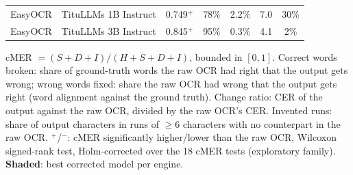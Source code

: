 \begin{table}[t]
\begin{tabular}{llccccc}
EasyOCR & TituLLMs 1B Instruct & 0.749$^{+}$ & 78\% & 2.2\% & 7.0 & 30\% \\
EasyOCR & TituLLMs 3B Instruct & 0.845$^{+}$ & 95\% & 0.3\% & 4.1 & 2\% \\
\bottomrule
\end{tabular}
\par\smallskip
\begin{minipage}{\linewidth}\footnotesize cMER $=(S{+}D{+}I)/(H{+}S{+}D{+}I)$, bounded in $[0,1]$. Correct words broken: share of ground-truth words the raw OCR had right that the output gets wrong; wrong words fixed: share the raw OCR had wrong that the output gets right (word alignment against the ground truth). Change ratio: CER of the output against the raw OCR, divided by the raw OCR's CER. Invented runs: share of output characters in runs of $\geq$6 characters with no counterpart in the raw OCR. $^{+}$/$^{-}$: cMER significantly higher/lower than the raw OCR, Wilcoxon signed-rank test, Holm-corrected over the 18 cMER tests (exploratory family). \colorbox{bestbg}{\textbf{Shaded}}: best corrected model per engine.\end{minipage}
\end{table}
